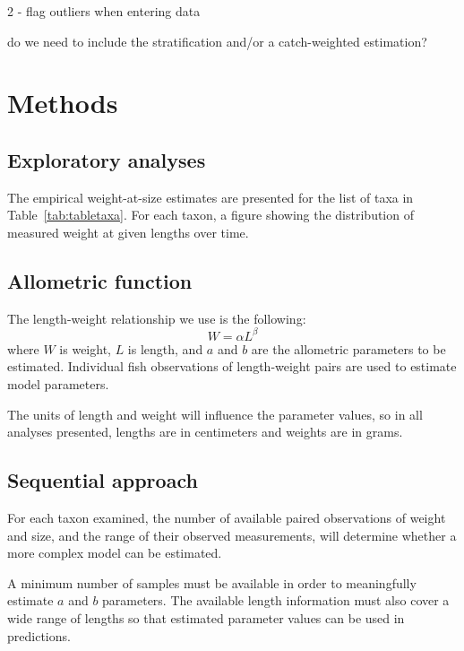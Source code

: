 \documentclass[12pt]{article}\usepackage[]{graphicx}\usepackage[]{color}
\begin{document}
2 - flag outliers when entering data

do we need to include the stratification and/or a catch-weighted estimation?

\section{Methods}\label{methods}

\subsection{Exploratory analyses}\label{exploratory-analyses}

The empirical weight-at-size estimates are presented for the list of taxa in Table~\ref{tab:tabletaxa}. For each taxon, a figure showing the distribution of measured weight at given lengths over time.

\subsection{Allometric function}\label{allometric-function}

The length-weight relationship we use is the following: \begin{equation}
W = \alpha L^{\beta}
\end{equation} where \(W\) is weight, \(L\) is length, and \(a\) and \(b\) are the allometric parameters to be estimated.
Individual fish observations of length-weight pairs are used to estimate model parameters.

The units of length and weight will influence the parameter values, so in all analyses presented, lengths are in centimeters and weights are in grams.

\subsection{Sequential approach}\label{sequential-approach}

For each taxon examined, the number of available paired observations of weight and size, and the range of their observed measurements, will determine whether a more complex model can be estimated.

A minimum number of samples must be available in order to meaningfully estimate \(a\) and \(b\) parameters. The available length information must also cover a wide range of lengths so that estimated parameter values can be used in predictions.
\end{document}
